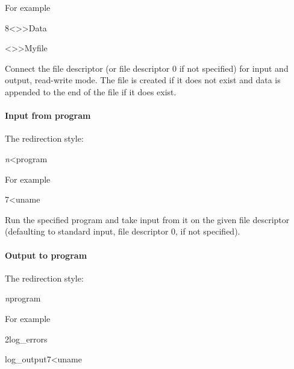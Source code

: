 For example

\begin{expara}

8{\textless}{\textgreater}{\textgreater}Data

{\textless}{\textgreater}{\textgreater}Myfile

\end{expara}

Connect the file descriptor (or file descriptor 0 if not specified) for input and output, read-write mode. The file is created if it
does not exist and data is appended to the end of the file if it does exist.

\paragraph{Input from program}

The redirection style:

\begin{expara}

\textit{n}{\textless}{\textbar}program

\end{expara}

For example

\begin{expara}

7{\textless}{\textbar}uname

\end{expara}

Run the specified program and take input from it on the given file descriptor (defaulting to standard input, file descriptor 0, if not specified).

\paragraph{Output to program}

The redirection style:

\begin{expara}

\textit{n}{\textbar}program

\end{expara}

For example

\begin{expara}

2{\textbar}log\_errors

{\textbar}log\_output7{\textless}{\textbar}uname

\end{expara}

